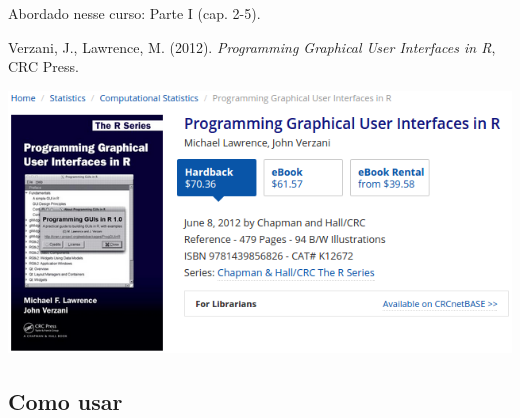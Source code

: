 \begin{frame}

  Abordado nesse curso: Parte I (cap. 2-5).
 \vspace{1ex}

  Verzani, J., Lawrence, M. (2012). \emph{Programming Graphical User
    Interfaces in R}, CRC Press.

  \begin{center}
    \includegraphics[width=0.8\linewidth]{./images/ProgGUI-2.png}
  \end{center}

\end{frame}


\subsection{Como usar}


